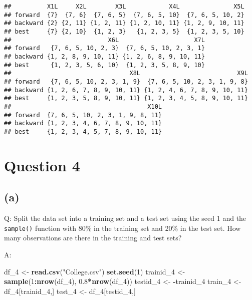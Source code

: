 \documentclass[
]{article}
\newenvironment{Shaded}{\begin{snugshade}}{\end{snugshade}}
\newcommand{\DecValTok}[1]{\textcolor[rgb]{0.00,0.00,0.81}{#1}}
\newcommand{\FloatTok}[1]{\textcolor[rgb]{0.00,0.00,0.81}{#1}}
\newcommand{\KeywordTok}[1]{\textcolor[rgb]{0.13,0.29,0.53}{\textbf{#1}}}
\newcommand{\NormalTok}[1]{#1}
\newcommand{\OperatorTok}[1]{\textcolor[rgb]{0.81,0.36,0.00}{\textbf{#1}}}
\newcommand{\StringTok}[1]{\textcolor[rgb]{0.31,0.60,0.02}{#1}}
\begin{document}
\begin{verbatim}
##          X1L     X2L        X3L            X4L               X5L
## forward  {7}  {7, 6}  {7, 6, 5}  {7, 6, 5, 10}  {7, 6, 5, 10, 2}
## backward {2} {2, 11} {1, 2, 11} {1, 2, 10, 11} {1, 2, 9, 10, 11}
## best     {7} {2, 10}  {1, 2, 3}   {1, 2, 3, 5}  {1, 2, 3, 5, 10}
##                           X6L                     X7L
## forward   {7, 6, 5, 10, 2, 3}  {7, 6, 5, 10, 2, 3, 1}
## backward {1, 2, 8, 9, 10, 11} {1, 2, 6, 8, 9, 10, 11}
## best      {1, 2, 3, 5, 6, 10}  {1, 2, 3, 5, 8, 9, 10}
##                                 X8L                           X9L
## forward   {7, 6, 5, 10, 2, 3, 1, 9}  {7, 6, 5, 10, 2, 3, 1, 9, 8}
## backward {1, 2, 6, 7, 8, 9, 10, 11} {1, 2, 4, 6, 7, 8, 9, 10, 11}
## best     {1, 2, 3, 5, 8, 9, 10, 11} {1, 2, 3, 4, 5, 8, 9, 10, 11}
##                                      X10L
## forward  {7, 6, 5, 10, 2, 3, 1, 9, 8, 11}
## backward {1, 2, 3, 4, 6, 7, 8, 9, 10, 11}
## best     {1, 2, 3, 4, 5, 7, 8, 9, 10, 11}
\end{verbatim}

\pagebreak

\hypertarget{question-4}{%
\section{Question 4}\label{question-4}}

\hypertarget{a-1}{%
\subsection{(a)}\label{a-1}}

Q: Split the data set into a training set and a test set using the seed
1 and the \texttt{sample()} function with 80\% in the training set and
20\% in the test set. How many observations are there in the training
and test sets?

A:

\begin{Shaded}
\begin{Highlighting}[]
\NormalTok{df_}\DecValTok{4}\NormalTok{ <-}\StringTok{ }\KeywordTok{read.csv}\NormalTok{(}\StringTok{"College.csv"}\NormalTok{)}
\KeywordTok{set.seed}\NormalTok{(}\DecValTok{1}\NormalTok{)}
\NormalTok{trainid_}\DecValTok{4}\NormalTok{ <-}\StringTok{ }\KeywordTok{sample}\NormalTok{(}\DecValTok{1}\OperatorTok{:}\KeywordTok{nrow}\NormalTok{(df_}\DecValTok{4}\NormalTok{), }\FloatTok{0.8}\OperatorTok{*}\KeywordTok{nrow}\NormalTok{(df_}\DecValTok{4}\NormalTok{))}
\NormalTok{testid_}\DecValTok{4}\NormalTok{ <-}\StringTok{ }\OperatorTok{-}\NormalTok{trainid_}\DecValTok{4}
\NormalTok{train_}\DecValTok{4}\NormalTok{ <-}\StringTok{ }\NormalTok{df_}\DecValTok{4}\NormalTok{[trainid_}\DecValTok{4}\NormalTok{,]}
\NormalTok{test_}\DecValTok{4}\NormalTok{ <-}\StringTok{ }\NormalTok{df_}\DecValTok{4}\NormalTok{[testid_}\DecValTok{4}\NormalTok{,]}
\end{Highlighting}
\end{Shaded}
\end{document}
